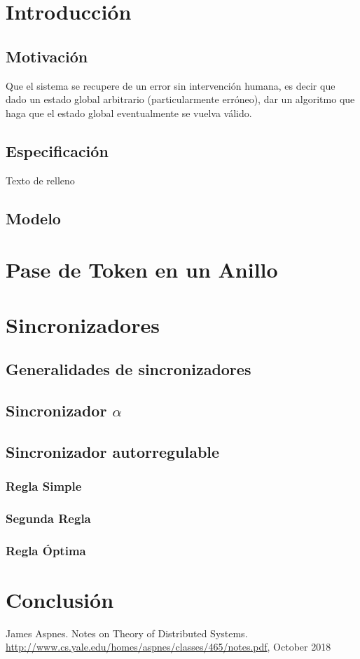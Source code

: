 \documentclass[12pt,a4paper]{article}
\begin{document}
\section{Introducción}{
\subsection{Motivación}{
Que el sistema se recupere de un error sin intervención humana, es decir que
dado un estado global arbitrario (particularmente erróneo), dar un algoritmo
que haga que el estado global eventualmente se vuelva válido.
}
\subsection{Especificación}{
Texto de relleno
}
    \subsection{Modelo}{}
}
\section{Pase de Token en un Anillo}{}
\section{Sincronizadores}{
    \subsection{Generalidades de sincronizadores}{}

    \subsection{Sincronizador $\alpha$}{}

    \subsection{Sincronizador autorregulable}{}

        \subsubsection{Regla Simple}{}

        \subsubsection{Segunda Regla}{}

        \subsubsection{Regla Óptima}{}




}
\section{Conclusión}{}


\begin{thebibliography}{}

James Aspnes. Notes on Theory of Distributed Systems.
\href{http://www.cs.yale.edu/homes/aspnes/classes/465/notes.pdf}
{http://www.cs.yale.edu/homes/aspnes/classes/465/notes.pdf},   October 2018

\end{thebibliography}
\end{document}
